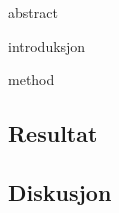 \documentclass {article}
\begin{document}
 {abstract}

 {introduksjon}

 {method}

\subsection {Resultat}

\subsection {Diskusjon}



\end{document}
